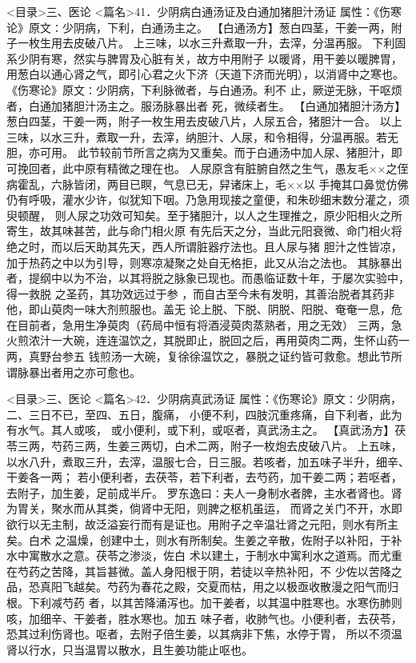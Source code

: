 \documentclass[a4paper,12pt,UTF8,twoside]{ctexbook}
\begin{document}
<目录>三、医论
<篇名>41．少阴病白通汤证及白通加猪胆汁汤证
属性：《伤寒论》原文∶少阴病，下利，白通汤主之。 
【白通汤方】葱白四茎，干姜一两，附子一枚生用去皮破八片。 
上三味，以水三升煮取一升，去滓，分温再服。 
下利固系少阴有寒，然实与脾胃及心脏有关，故方中用附子 
以暖肾，用干姜以暖脾胃，用葱白以通心肾之气，即引心君之火下济（天道下济而光明），以消肾中之寒也。 
《伤寒论》原文∶少阴病，下利脉微者，与白通汤。利不 
止，厥逆无脉，干呕烦者，白通加猪胆汁汤主之。服汤脉暴出者 
死，微续者生。 
【白通加猪胆汁汤方】葱白四茎，干姜一两，附子一枚生用去皮破八片，人尿五合，猪胆汁一合。 
以上三味，以水三升，煮取一升，去滓，纳胆汁、人尿，和令相得，分温再服。若无胆，亦可用。 
此节较前节所言之病为又重矣。而于白通汤中加人尿、猪胆汁，即可挽回者，此中原有精微之理在也。 
人尿原含有脏腑自然之生气，愚友毛××之侄病霍乱，六脉皆闭，两目已瞑，气息已无，舁诸床上，毛××以 
手掩其口鼻觉仿佛仍有呼吸，灌水少许，似犹知下咽。乃急用现接之童便，和朱砂细末数分灌之，须臾顿醒， 
则人尿之功效可知矣。至于猪胆汁，以人之生理推之，原少阳相火之所寄生，故其味甚苦，此与命门相火原 
有先后天之分，当此元阳衰微、命门相火将绝之时，而以后天助其先天，西人所谓脏器疗法也。且人尿与猪 
胆汁之性皆凉，加于热药之中以为引导，则寒凉凝聚之处自无格拒，此又从治之法也。 
其脉暴出者，提纲中以为不治，以其将脱之脉象已现也。而愚临证数十年，于屡次实验中，得一救脱 
之圣药，其功效远过于参 ，而自古至今未有发明，其善治脱者其药非他，即山萸肉一味大剂煎服也。盖无 
论上脱、下脱、阴脱、阳脱、奄奄一息，危在目前者，急用生净萸肉（药局中恒有将酒浸萸肉蒸熟者，用之无效） 
三两，急火煎浓汁一大碗，连连温饮之，其脱即止，脱回之后，再用萸肉二两，生怀山药一两，真野台参五 
钱煎汤一大碗，复徐徐温饮之，暴脱之证约皆可救愈。想此节所谓脉暴出者用之亦可愈也。 

<目录>三、医论
<篇名>42．少阴病真武汤证
属性：《伤寒论》原文∶少阴病，二、三日不已，至四、五日，腹痛， 
小便不利，四肢沉重疼痛，自下利者，此为有水气。其人或咳， 
或小便利，或下利，或呕者，真武汤主之。 
【真武汤方】茯苓三两，芍药三两，生姜三两切，白术二两，附子一枚炮去皮破八片。 
上五味，以水八升，煮取三升，去滓，温服七合，日三服。若咳者，加五味子半升，细辛、干姜各一两； 
若小便利者，去茯苓，若下利者，去芍药，加干姜二两；若呕者，去附子，加生姜，足前成半斤。 
罗东逸曰∶夫人一身制水者脾，主水者肾也。肾为胃关，聚水而从其类，倘肾中无阳，则脾之枢机虽运， 
而肾之关门不开，水即欲行以无主制，故泛溢妄行而有是证也。用附子之辛温壮肾之元阳，则水有所主矣。白术 
之温燥，创建中土，则水有所制矣。生姜之辛散，佐附子以补阳，于补水中寓散水之意。茯苓之渗淡，佐白 
术以建土，于制水中寓利水之道焉。而尤重在芍药之苦降，其旨甚微。盖人身阳根于阴，若徒以辛热补阳，不 
少佐以苦降之品，恐真阳飞越矣。芍药为春花之殿，交夏而枯，用之以极亟收散漫之阳气而归根。下利减芍药 
者，以其苦降涌泻也。加干姜者，以其温中胜寒也。水寒伤肺则咳，加细辛、干姜者，胜水寒也。加五 
味子者，收肺气也。小便利者，去茯苓，恐其过利伤肾也。呕者，去附子倍生姜，以其病非下焦，水停于胃， 
所以不须温肾以行水，只当温胃以散水，且生姜功能止呕也。 
\end{document}
